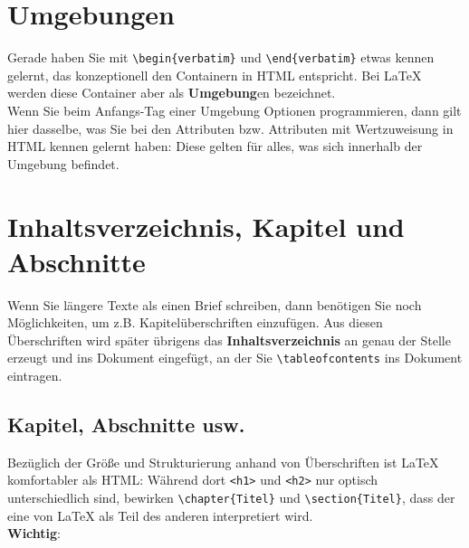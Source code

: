 \section{Umgebungen}

Gerade haben Sie mit \verb|\begin{verbatim}| und \verb|\end{verbatim}| etwas kennen gelernt, das konzeptionell den Containern in HTML entspricht. Bei LaTeX werden diese Container aber als \textbf{Umgebung}en bezeichnet.\\

Wenn Sie beim Anfangs-\glqq{}Tag\grqq{} einer Umgebung Optionen programmieren, dann gilt hier dasselbe, was Sie bei den Attributen bzw. Attributen mit Wertzuweisung in HTML kennen gelernt haben: Diese gelten für alles, was sich innerhalb der Umgebung befindet.

\section{Inhaltsverzeichnis, Kapitel und Abschnitte}

Wenn Sie längere Texte als einen Brief schreiben, dann benötigen Sie noch Möglichkeiten, um z.B. Kapitelüberschriften einzufügen. Aus diesen \\Überschriften wird später übrigens das \textbf{Inhaltsverzeichnis} an genau der Stelle erzeugt und ins Dokument eingefügt, an der Sie \verb|\tableofcontents| ins Dokument eintragen.

\subsection{Kapitel, Abschnitte usw.}

Bezüglich der Größe und Strukturierung anhand von Überschriften ist LaTeX komfortabler als HTML: Während dort \verb|<h1>| und \verb|<h2>| nur optisch unterschiedlich sind, bewirken \verb|\chapter{Titel}| und \verb|\section{Titel}|, dass der eine von LaTeX als Teil des anderen interpretiert wird.\\

\textbf{Wichtig}:\\

